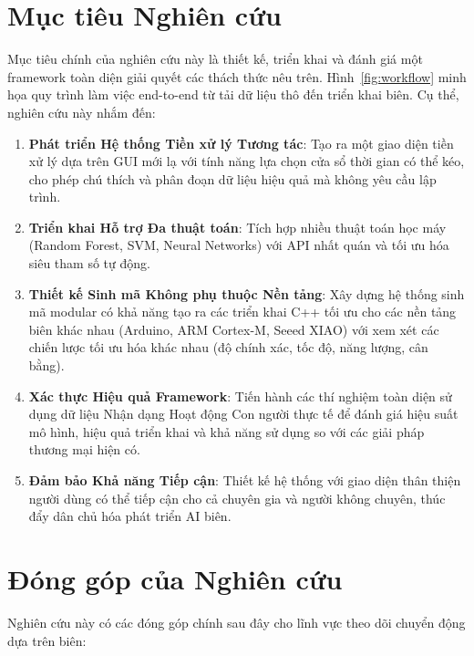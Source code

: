 \section{Mục tiêu Nghiên cứu}

Mục tiêu chính của nghiên cứu này là thiết kế, triển khai và đánh giá một framework toàn diện giải quyết các thách thức nêu trên. Hình~\ref{fig:workflow} minh họa quy trình làm việc end-to-end từ tải dữ liệu thô đến triển khai biên. Cụ thể, nghiên cứu này nhắm đến:

\begin{enumerate}
\item \textbf{Phát triển Hệ thống Tiền xử lý Tương tác}: Tạo ra một giao diện tiền xử lý dựa trên GUI mới lạ với tính năng lựa chọn cửa sổ thời gian có thể kéo, cho phép chú thích và phân đoạn dữ liệu hiệu quả mà không yêu cầu lập trình.

\item \textbf{Triển khai Hỗ trợ Đa thuật toán}: Tích hợp nhiều thuật toán học máy (Random Forest, SVM, Neural Networks) với API nhất quán và tối ưu hóa siêu tham số tự động.

\item \textbf{Thiết kế Sinh mã Không phụ thuộc Nền tảng}: Xây dựng hệ thống sinh mã modular có khả năng tạo ra các triển khai C++ tối ưu cho các nền tảng biên khác nhau (Arduino, ARM Cortex-M, Seeed XIAO) với xem xét các chiến lược tối ưu hóa khác nhau (độ chính xác, tốc độ, năng lượng, cân bằng).

\item \textbf{Xác thực Hiệu quả Framework}: Tiến hành các thí nghiệm toàn diện sử dụng dữ liệu Nhận dạng Hoạt động Con người thực tế để đánh giá hiệu suất mô hình, hiệu quả triển khai và khả năng sử dụng so với các giải pháp thương mại hiện có.

\item \textbf{Đảm bảo Khả năng Tiếp cận}: Thiết kế hệ thống với giao diện thân thiện người dùng có thể tiếp cận cho cả chuyên gia và người không chuyên, thúc đẩy dân chủ hóa phát triển AI biên.
\end{enumerate}

\section{Đóng góp của Nghiên cứu}

Nghiên cứu này có các đóng góp chính sau đây cho lĩnh vực theo dõi chuyển động dựa trên biên:

